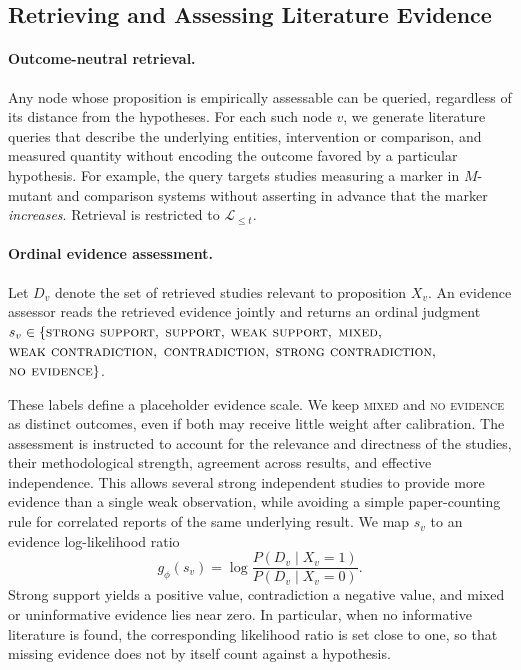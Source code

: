 \documentclass[twoside]{article}
\begin{document}
\subsection{Retrieving and Assessing Literature Evidence}
\label{sec:evidence}

\paragraph{Outcome-neutral retrieval.}
Any node whose proposition is empirically assessable can be queried, regardless
of its distance from the hypotheses. For each such node $v$, we generate
literature queries that describe the underlying entities, intervention or
comparison, and measured quantity without encoding the outcome favored by a
particular hypothesis. For example, the query targets studies measuring a marker in $M$-mutant and
comparison systems without asserting in advance that the marker
\emph{increases}. Retrieval is restricted to
$\mathcal{L}_{\leq t}$.

\paragraph{Ordinal evidence assessment.}
Let $D_v$ denote the set of retrieved studies relevant to proposition $X_v$.
An evidence assessor reads the retrieved evidence jointly and returns an
ordinal judgment
$s_v\in \{\textsc{strong support},$
$\textsc{support},$
$\textsc{weak support},$
$\textsc{mixed},$
$\textsc{weak contradiction},$
$\textsc{contradiction},$
$\textsc{strong contradiction},$
$\textsc{no evidence}\}$.

These labels define a placeholder evidence scale. We keep
\textsc{mixed} and \textsc{no evidence} as distinct outcomes, even if both may
receive little weight after calibration. The assessment is instructed to
account for the relevance and directness of the studies, their
methodological strength, agreement across results, and effective independence.
This allows several strong independent studies to provide more evidence than a
single weak observation, while avoiding a simple paper-counting rule for
correlated reports of the same underlying result.
We map $s_v$ to an evidence log-likelihood ratio
\begin{equation}
    g_{\phi}(s_v)
    =
    \log
    \frac{P(D_v\mid X_v=1)}
         {P(D_v\mid X_v=0)}.
    \label{eq:evidence-lr}
\end{equation}
Strong support yields a positive value, contradiction a negative value, and
mixed or uninformative evidence lies near zero. In particular, when no
informative literature is found, the corresponding likelihood ratio is set
close to one, so that missing evidence does not by itself count against a
hypothesis.
\end{document}

